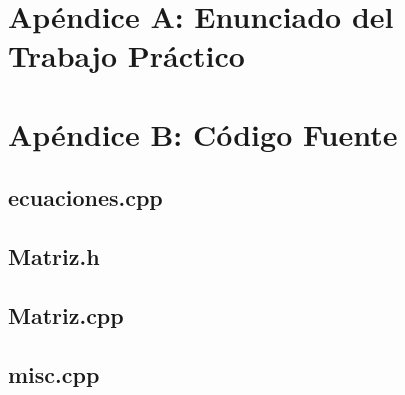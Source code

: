 \documentclass[a4paper,10pt,twoside]{article}
\begin{document}


\newpage

\section{Apéndice A: Enunciado del Trabajo Práctico}





\newpage

\section{Apéndice B: Código Fuente}


\subsection{ecuaciones.cpp}



\subsection{Matriz.h}



\subsection{Matriz.cpp}



\subsection{misc.cpp}

\end{document}
